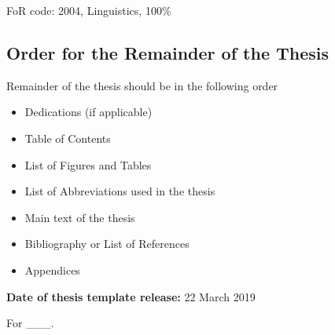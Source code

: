 
FoR code: 2004, Linguistics, 100\% \\



\begin{instructional}
\section*{Order for the Remainder of the Thesis}
\noindent
    Remainder of the thesis should be in the following order

    \begin{itemize}
        \item Dedications (if applicable)
        \item Table of Contents
        \item List of Figures and Tables
        \item List of Abbreviations used in the thesis
        \item Main text of the thesis
        \item Bibliography or List of References
        \item Appendices
    \end{itemize}

\noindent
\textbf{Date of thesis template release:} 22 March 2019
\end{instructional}
\clearpage


	\rmfamily
	\normalfont

	\begin{vplace}[1]
		\begin{center}
			For \_\_\_.
		\end{center}
	\end{vplace}


\clearpage
\pagestyle{headings}


\tableofcontents
	\clearpage
\listoffigures
	\clearpage
\listoftables
\newpage

